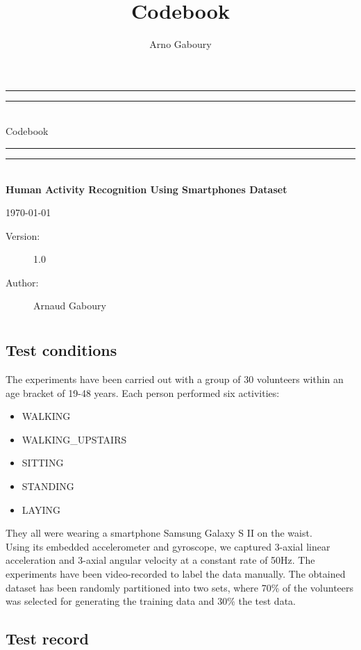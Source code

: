 \documentclass[fontsize=12pts,BCOR=8.25mm]{scrartcl}\usepackage[]{graphicx}\usepackage[]{color}
\title {Codebook}
\author{Arno Gaboury}
\date{}
\newcommand*{\titleGP}{\begingroup %
\centering %
\vspace*{\baselineskip} %
{\begingroup
\color{mydarkgreen}
\rule{\textwidth}{1.6pt}\vspace*{-\baselineskip}\vspace*{2pt} %
\rule{\textwidth}{0.4pt}\\[\baselineskip] %

{\Huge Codebook}\\[0.2\baselineskip] %

\rule{\textwidth}{0.4pt}\vspace*{-\baselineskip}\vspace{3.2pt} %
\rule{\textwidth}{1.6pt}\\[\baselineskip] %

 {\large \bfseries Human Activity Recognition Using Smartphones Dataset}
\vspace*{2\baselineskip} 

\today
\endgroup}

\vfill %

{\large
\begin{description}
\item [Version:] 1.0
\item [Author:]Arnaud Gaboury 
\end{description}}

\endgroup}
\begin{document}
\titleGP
\clearpage

\tableofcontents
\clearpage

\section{\texorpdfstring{\color{mydarkgreen}{General Information}}{}}

\subsection{Test conditions}


The experiments have been carried out with a group of 30 volunteers within an
age bracket of 19-48 years. Each person performed six activities: 

\begin{itemize}
\item WALKING
\item WALKING\_UPSTAIRS
\item SITTING
\item STANDING
\item LAYING
\end{itemize}
They all were wearing a smartphone Samsung Galaxy S II on the waist.\\



Using its embedded accelerometer and gyroscope, we captured 3-axial 
linear acceleration and 3-axial angular velocity at a constant rate of 50Hz. 
The experiments have been video-recorded to label the data manually. The 
obtained dataset has been randomly partitioned into two sets, where 70\% 
of the volunteers was selected for generating the training data and 30\%
the test data. \\


\subsection{Test record}


\section{\texorpdfstring{\color{mydarkgreen}{Coding guidelines}}{}}
\section{\texorpdfstring{\color{mydarkgreen}{Major Topic Codes}}{}}
\end{document}

